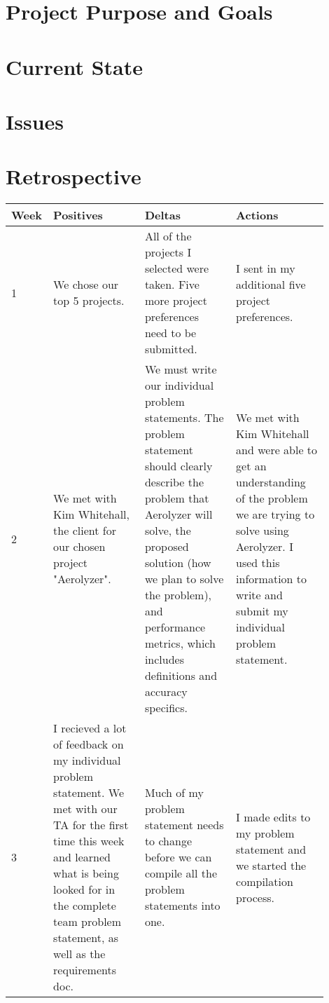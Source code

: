 \documentclass[onecolumn, draftclsnofoot,10pt, compsoc]{IEEEtran}
\begin{document}
\begin{singlespace}

	\section{Project Purpose and Goals}

		
	\section{Current State}


	\section{Issues}


	\section{Retrospective}
		\begin{tabular}{|l|p{0.3\linewidth}|p{0.3\linewidth}|p{0.3\linewidth}|}\hline \textbf{Week} & \textbf{Positives} & \textbf{Deltas} & \textbf{Actions}\\\hline
		1 	& We chose our top 5 projects. & All of the projects I selected were taken. Five more project preferences need to be submitted. & I sent in my additional five project preferences. \\\hline

		2 	& We met with Kim Whitehall, the client for our chosen project "Aerolyzer". & We must write our individual problem statements. The problem statement should clearly describe the problem that Aerolyzer will solve, the proposed solution (how we plan to solve the problem), and performance metrics, which includes definitions and accuracy specifics.  & We met with Kim Whitehall and were able to get an understanding of the problem we are trying to solve using Aerolyzer. I used this information to write and submit my individual problem statement. \\\hline

		3 	& I recieved a lot of feedback on my individual problem statement. We met with our TA for the first time this week and learned what is being looked for in the complete team problem statement, as well as the requirements doc.  & Much of my problem statement needs to change before we can compile all the problem statements into one. & I made edits to my problem statement and we started the compilation process. \\\hline


\end{tabular}
\end{singlespace}
\end{document}
